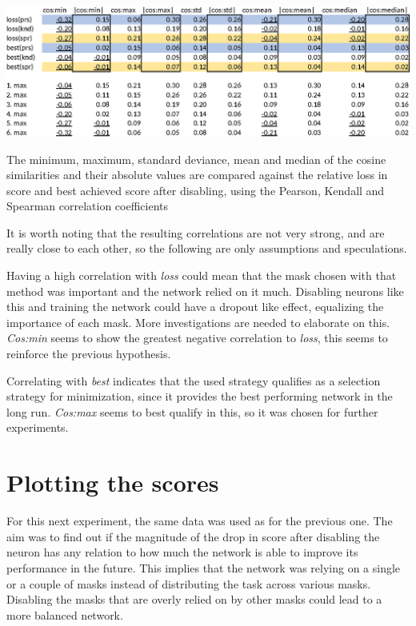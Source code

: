 \documentclass[12pt]{report}
\begin{document}
\begin{table}[!ht]
	\centering
	\includegraphics[scale=0.85]{dia/table.eps}
	\caption{The minimum, maximum, standard deviance, mean and median of the cosine similarities and their absolute values are compared against the relative loss in score and best achieved score after disabling, using the Pearson, Kendall and Spearman correlation coefficients}
	\label{correlations}
\end{table}

It is worth noting that the resulting correlations are not very strong, and are really close to each other, so the following are only assumptions and speculations.

Having a high correlation with \textit{loss} could mean that the mask chosen with that method was important and the network relied on it much. Disabling neurons like this and training the network could have a dropout like effect, equalizing the importance of each mask. More investigations are needed to elaborate on this. \textit{Cos:min} seems to show the greatest negative correlation to \textit{loss}, this seems to reinforce the previous hypothesis.

Correlating with \textit{best} indicates that the used strategy qualifies as a selection strategy for minimization, since it provides the best performing network in the long run. \textit{Cos:max} seems to best qualify in this, so it was chosen for further experiments.

\section{Plotting the scores}
For this next experiment, the same data was used as for the previous one. The aim was to find out if the magnitude of the drop in score after disabling the neuron has any relation to how much the network is able to improve its performance in the future. This implies that the network was relying on a single or a couple of masks instead of distributing the task across various masks. Disabling the masks that are overly relied on by other masks could lead to a more balanced network.
\end{document}
